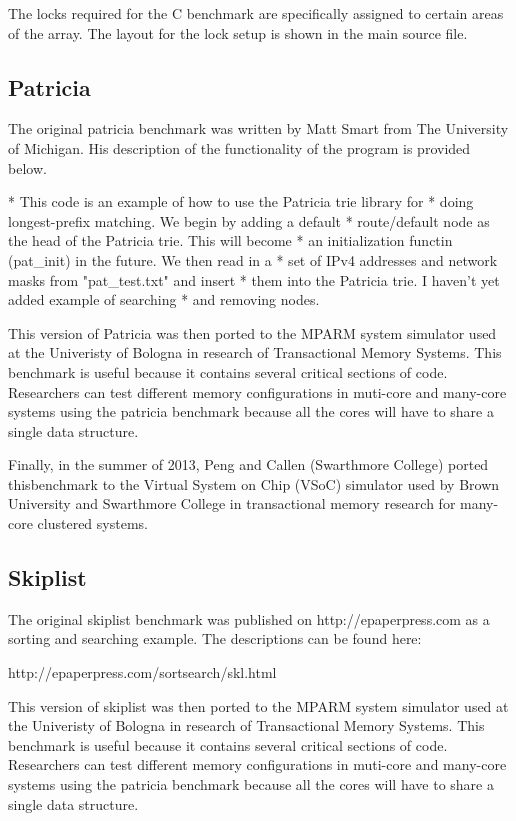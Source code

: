 \documentclass{article}
\begin{document}
The locks required for the C benchmark are specifically assigned to certain 
areas of the array. The layout for the lock setup is shown in the main source 
file.

\subsection{Patricia}

The original patricia benchmark was written by Matt Smart from The University of
 Michigan. His description of the functionality of the program is provided
below. 

 * This code is an example of how to use the Patricia trie library for
 * doing longest-prefix matching.  We begin by adding a default
 * route/default node as the head of the Patricia trie.  This will become
 * an initialization functin (pat\_init) in the future.  We then read in a
 * set of IPv4 addresses and network masks from "pat\_test.txt" and insert
 * them into the Patricia trie.  I haven't yet added example of searching
 * and removing nodes.

This version of Patricia was then ported to the MPARM system simulator used at 
the Univeristy of Bologna in research of Transactional Memory Systems. This
benchmark is useful because it contains several critical sections of code. 
Researchers can test different memory configurations in muti-core and many-core 
systems using the patricia benchmark because all the cores will have to share a 
single data structure. 

Finally, in the summer of 2013, Peng and Callen (Swarthmore College) ported 
thisbenchmark to the Virtual System on Chip (VSoC) simulator used by Brown 
University and Swarthmore College in transactional memory research for 
many-core clustered systems. 

\subsection{Skiplist}

The original skiplist benchmark was published on http://epaperpress.com
as a sorting and searching example. The descriptions can be found here:

http://epaperpress.com/sortsearch/skl.html

This version of skiplist was then ported to the MPARM system simulator used at 
the Univeristy of Bologna in research of Transactional Memory Systems. This
benchmark is useful because it contains several critical sections of code. 
Researchers can test different memory configurations in muti-core and 
many-core systems using the patricia benchmark because all the cores will have 
to share a single data structure. 
\end{document}
